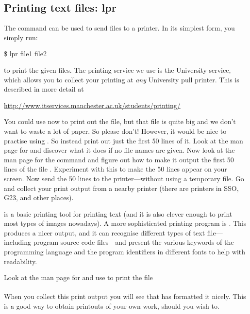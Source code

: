 \subsection{Printing text files: lpr}

The command  can be used to send files to a printer. In its
simplest form, you simply run:
%
\begin{ttoutenv}
\$  lpr file1 file2
\end{ttoutenv}
%
to print the given files. The printing service we use is the University  service, which allows you to collect your printing at \emph{any} University pull printer. This is described in more detail at

{\small
\url{http://www.itservices.manchester.ac.uk/students/printing/}
}

You could use  now to print out the 
file, but that file is quite big and we don't want to waste a lot of
paper. So please don't! However, it would be nice to practise using
. So instead print out just the first 50 lines of
it. Look at the man page for  and discover what it does
if no file names are given. Now look at the man page for the command
 and figure out how to make it output the first 50 lines
of the file .  Experiment with this to make the 50
lines appear on your screen.
Now send the 50 lines to the
printer---without using a temporary file. Go and collect your print output
from a nearby printer (there are printers in SSO, G23, and other places).
%

 is a basic printing tool for printing text (and it is also
clever enough to print most types of images nowadays). A more sophisticated
printing program is . This produces a nicer output, and it
can recognise different types of text file---including program
source code files---and present the various keywords of the programming
language and the program identifiers in different fonts to help with
readability.

Look at the man page for  and use  to print the file
\\

\\

When you collect
this print output you will see that  has formatted it nicely. This is a
good way to obtain printouts of your own work, should you wish to.

